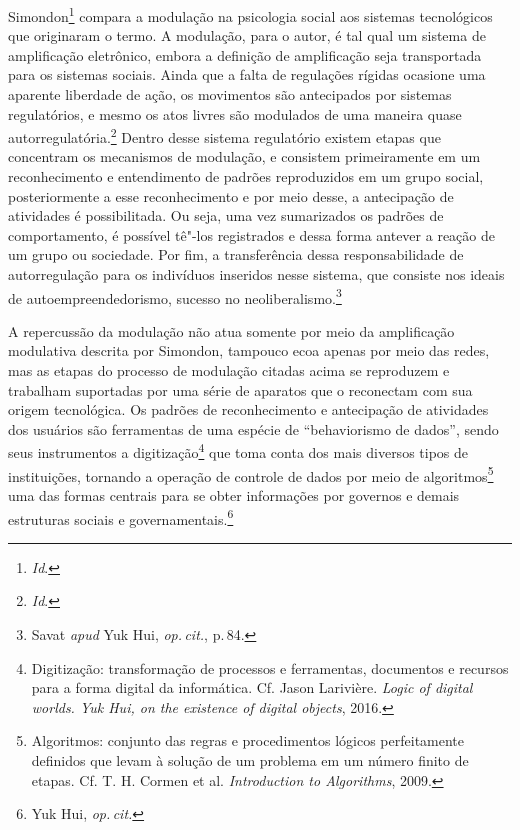 Simondon\footnote{\textit{Id}.} compara a modulação na psicologia social
aos sistemas tecnológicos que originaram o termo. A modulação, para o
autor, é tal qual um sistema de amplificação eletrônico, embora a
definição de amplificação seja transportada para os sistemas sociais.
Ainda que a falta de regulações rígidas ocasione uma aparente liberdade
de ação, os movimentos são antecipados por sistemas regulatórios, e
mesmo os atos livres são modulados de uma maneira quase autorregulatória.\footnote{\textit{Id}.}
Dentro desse sistema regulatório existem etapas que
concentram os mecanismos de modulação, e consistem primeiramente em um
reconhecimento e entendimento de padrões reproduzidos em um grupo
social, posteriormente a esse reconhecimento e por meio desse, a
antecipação de atividades é possibilitada. Ou seja, uma vez sumarizados
os padrões de comportamento, é possível tê"-los registrados e dessa forma
antever a reação de um grupo ou sociedade. Por fim, a transferência
dessa responsabilidade de autorregulação para os indivíduos inseridos
nesse sistema, que consiste nos ideais de autoempreendedorismo, sucesso
no neoliberalismo.\footnote{Savat \emph{apud} Yuk Hui, \textit{op.\,cit.}, p.\,84.}

A repercussão da modulação não atua somente por meio da amplificação
modulativa descrita por Simondon, tampouco ecoa apenas por meio das
redes, mas as etapas do processo de modulação citadas acima se
reproduzem e trabalham suportadas por uma série de aparatos que o
reconectam com sua origem tecnológica. Os padrões de reconhecimento e
antecipação de atividades dos usuários são ferramentas de uma espécie de
``behaviorismo de dados'', sendo seus instrumentos a
digitização\footnote{Digitização: transformação de processos e
  ferramentas, documentos e recursos para a forma digital da informática. Cf. Jason Larivière. \emph{Logic of digital worlds. Yuk Hui, on the
existence of digital objects}, 2016.} que toma conta dos mais diversos tipos de
instituições, tornando a operação de controle de dados por meio de
algoritmos\footnote{Algoritmos: conjunto das regras e procedimentos
  lógicos perfeitamente definidos que levam à solução de um problema em
  um número finito de etapas. Cf. T. H. Cormen et al. \emph{Introduction to Algorithms}, 2009.} uma das formas centrais para se obter
informações por governos e demais estruturas sociais e governamentais.\footnote{Yuk Hui, \textit{op.\,cit.}}

